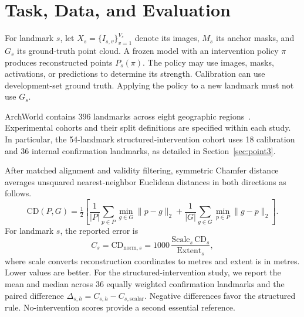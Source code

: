 \section{Task, Data, and Evaluation}
\label{sec:task}
For landmark $s$, let $X_s=\{I_{s,v}\}_{v=1}^{V_s}$ denote its images, $M_s$ its anchor masks, and $G_s$ its ground-truth point cloud. A frozen model with an intervention policy $\pi$ produces reconstructed points $P_s(\pi)$. The policy may use images, masks, activations, or predictions to determine its strength. Calibration can use development-set ground truth. Applying the policy to a new landmark must not use $G_s$.

ArchWorld contains 396 landmarks across eight geographic regions~\cite{archworld}. Experimental cohorts and their split definitions are specified within each study. In particular, the 54-landmark structured-intervention cohort uses 18 calibration and 36 internal confirmation landmarks, as detailed in Section~\ref{sec:point3}.

After matched alignment and validity filtering, symmetric Chamfer distance averages unsquared nearest-neighbor Euclidean distances in both directions as follows.
\begin{equation}
 \mathrm{CD}(P,G)=\tfrac12\left[
 \frac{1}{|P|}\sum_{p\in P}\min_{g\in G}\|p-g\|_2+
 \frac{1}{|G|}\sum_{g\in G}\min_{p\in P}\|g-p\|_2\right].
\end{equation}
For landmark $s$, the reported error is
\begin{equation}
 C_s=\mathrm{CD}_{\mathrm{norm},s}
      =1000\,\frac{\mathrm{Scale}_s\,\mathrm{CD}_s}{\mathrm{Extent}_s},
\end{equation}
where scale converts reconstruction coordinates to metres and extent is in metres. Lower values are better. For the structured-intervention study, we report the mean and median across 36 equally weighted confirmation landmarks and the paired difference $\Delta_{s,h}=C_{s,h}-C_{s,\mathrm{scalar}}$. Negative differences favor the structured rule. No-intervention scores provide a second essential reference.
